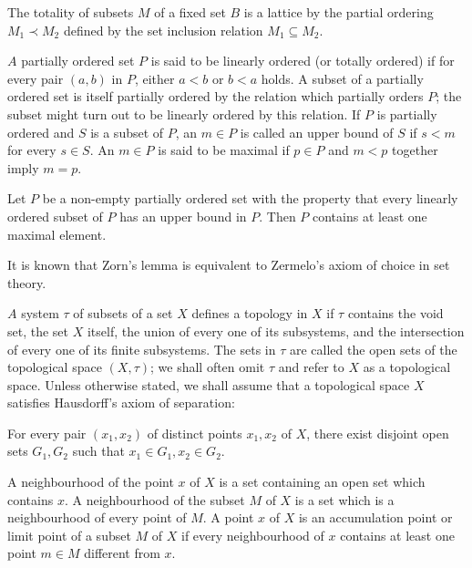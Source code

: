 \begin{examplen} The totality of subsets $M$ of a fixed set $B$ is a lattice by the partial ordering $M_{1} \prec M_{2}$ defined by the set inclusion relation $M_{1} \subseteq M_{2}$.

\end{examplen}
\begin{definitionu} $A$ partially ordered set $P$ is said to be linearly ordered (or totally ordered) if for every pair $(a, b)$ in $P$, either $a < b$ or $b < a$ holds. A subset of a partially ordered set is itself partially ordered by the relation which partially orders $P$; the subset might turn out to be linearly ordered by this relation. If $P$ is partially ordered and $S$ is a subset of $P$, an $m \in P$ is called an upper bound of $S$ if $s < m$ for every $s \in S$. An $m \in P$ is said to be maximal if $p \in P$ and $m < p$ together imply $m = p$. 
\end{definitionu}

\begin{lemman} Let $P$ be a non-empty partially ordered set with the property that every linearly ordered subset of $P$ has an upper bound in $P$. Then $P$ contains at least one maximal element. 
\end{lemman}

It is known that Zorn's lemma is equivalent to Zermelo's axiom of choice in set theory. 


\label{sec:0.2}


\begin{definitionu} $A$ system $\tau$ of subsets of a set $X$ defines a topology in $X$ if $\tau$ contains the void set, the set $X$ itself, the union of every one of its subsystems, and the intersection of every one of its finite subsystems. The sets in $\tau$ are called the open sets of the topological space $(X,\tau)$; we shall often omit $\tau$ and refer to $X$ as a topological space. Unless otherwise stated, we shall assume that a topological space $X$ satisfies Hausdorff's axiom of separation: 

For every pair $(x_{1}, x_{2})$ of distinct points $x_{1}, x_{2}$ of $X$, there exist disjoint open sets $G_{1}, G_{2}$ such that $x_{1} \in G_{1}, x_{2} \in G_{2}$. 
\end{definitionu}

A neighbourhood of the point $x$ of $X$ is a set containing an open set which contains $x$. A neighbourhood of the subset $M$ of $X$ is a set which is a neighbourhood of every point of $M$. A point $x$ of $X$ is an accumulation point or limit point of a subset $M$ of $X$ if every neighbourhood of $x$ contains at least one point $m \in M$ different from $x$. 


